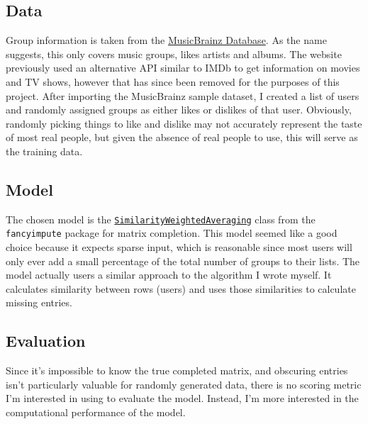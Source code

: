 \documentclass[12pt]{article}
\begin{document}
	\subsection*{Data}
	Group information is taken from the \href{https://musicbrainz.org/doc/MusicBrainz_Database/}{MusicBrainz Database}. As the name suggests, this only covers music groups, likes artists and albums. The website previously used an alternative API similar to IMDb to get information on movies and TV shows, however that has since been removed for the purposes of this project. After importing the MusicBrainz sample dataset, I created a list of users and randomly assigned groups as either likes or dislikes of that user. Obviously, randomly picking things to like and dislike may not accurately represent the taste of most real people, but given the absence of real people to use, this will serve as the training data.

	\subsection*{Model}
	The chosen model is the \href{https://github.com/iskandr/fancyimpute/blob/master/fancyimpute/similarity_weighted_averaging.py}{\tt SimilarityWeightedAveraging} class from the {\tt fancyimpute} package for matrix completion. This model seemed like a good choice because it expects sparse input, which is reasonable since most users will only ever add a small percentage of the total number of groups to their lists. The model actually users a similar approach to the algorithm I wrote myself. It calculates similarity between rows (users) and uses those similarities to calculate missing entries.

	\subsection*{Evaluation}
	Since it's impossible to know the true completed matrix, and obscuring entries isn't particularly valuable for randomly generated data, there is no scoring metric I'm interested in using to evaluate the model. Instead, I'm more interested in the computational performance of the model.
\end{document}

